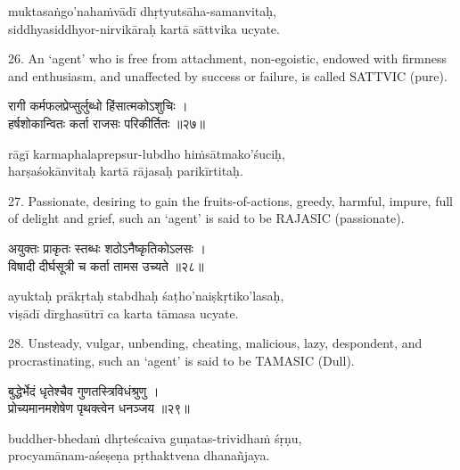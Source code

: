\begin{transliteration}
muktasaṅgo'nahaṁvādī dhṛtyutsāha-samanvitaḥ, \\
siddhyasiddhyor-nirvikāraḥ kartā sāttvika ucyate.
\end{transliteration}

26. An `agent' who is free from attachment, non-egoistic, endowed with firmness
and enthusiasm, and unaffected by success or failure, is called SATTVIC (pure).

\begin{gitaverse}
रागी कर्मफलप्रेप्सुर्लुब्धो हिंसात्मकोऽशुचिः । \\
हर्षशोकान्वितः कर्ता राजसः परिकीर्तितः ॥२७॥
\end{gitaverse}

\begin{transliteration}
rāgī karmaphalaprepsur-lubdho hiṁsātmako'śuciḥ, \\
harṣaśokānvitaḥ kartā rājasaḥ parikīrtitaḥ.
\end{transliteration}

27. Passionate, desiring to gain the fruits-of-actions, greedy, harmful,
impure, full of delight and grief, such an `agent' is said to be RAJASIC
(passionate).

\begin{gitaverse}
अयुक्तः प्राकृतः स्तब्धः शठोऽनैष्कृतिकोऽलसः । \\
विषादी दीर्घसूत्री च कर्ता तामस उच्यते ॥२८॥
\end{gitaverse}

\begin{transliteration}
ayuktaḥ prākṛtaḥ stabdhaḥ śaṭho'naiṣkṛtiko'lasaḥ, \\
viṣādī dīrghasūtrī ca karta tāmasa ucyate.
\end{transliteration}

28. Unsteady, vulgar, unbending, cheating, malicious, lazy, despondent, and
procrastinating, such an `agent' is said to be TAMASIC (Dull).

\begin{gitaverse}
बुद्धेर्भेदं धृतेश्चैव गुणतस्त्रिविधंश्रुणु । \\
प्रोच्यमानमशेषेण पृथक्त्वेन धनञ्जय ॥२९॥
\end{gitaverse}

\begin{transliteration}
buddher-bhedaṁ dhṛteścaiva guṇatas-trividhaṁ śṛṇu, \\
procyamānam-aśeṣeṇa pṛthaktvena dhanañjaya.
\end{transliteration}

